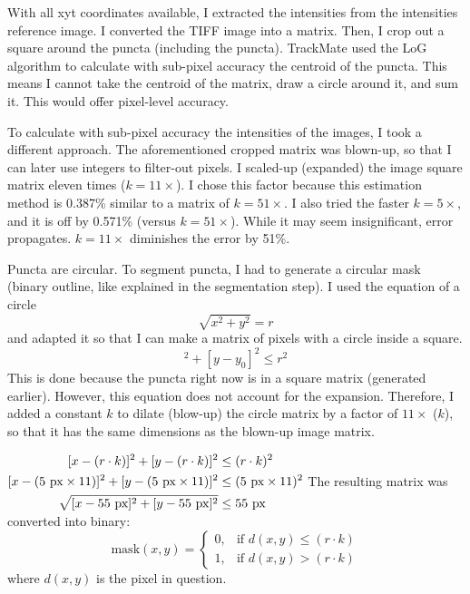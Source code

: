 With all xyt coordinates available, I extracted the intensities from the intensities reference image. I converted the TIFF image into a matrix. Then, I crop out a square around the puncta (including the puncta). TrackMate used the LoG algorithm to calculate with sub-pixel accuracy the centroid of the puncta. This means I cannot take the centroid of the matrix, draw a circle around it, and sum it. This would offer pixel-level accuracy.

To calculate with sub-pixel accuracy the intensities of the images, I took a different approach. The aforementioned cropped matrix was blown-up, so that I can later use integers to filter-out pixels. I scaled-up (expanded) the image square matrix eleven times ($k = 11 \times$). I chose this factor because this estimation method is 0.387\% similar to a matrix of $k = 51 \times$. I also tried the faster $k = 5 \times$, and it is off by 0.571\% (versus $k = 51 \times$). While it may seem insignificant, error propagates. $k = 11\times$ diminishes the error by 51\%.

Puncta are circular. To segment puncta, I had to generate a circular mask (binary outline, like explained in the segmentation step). I used the equation of a circle \begin{equation*}\sqrt{x^2 + y^2} = r\end{equation*} and adapted it so that I can make a matrix of pixels with a circle inside a square. \begin{equation*}[x - x_0]^2 + [y - y_0]^2 \le r^2\end{equation*} This is done because the puncta right now is in a square matrix (generated earlier). However, this equation does not account for the expansion. Therefore, I added a constant $k$ to dilate (blow-up) the circle matrix by a factor of $11\times$ ($k$), so that it has the same dimensions as the blown-up image matrix.

$\begin{aligned}
\relax[x - (r \cdot k)]^2 + [y - (r \cdot k)]^2 &\le (r \cdot k)^2\\
[x - (5\text{ px} \times 11)]^2 + [y - (5\text{ px} \times 11)]^2 &\le (5\text{ px} \times 11)^2 \\
\sqrt{[x - 55\text{ px}]^2 + [y - 55\text{ px}]^2} &\le 55\text{ px}
\end{aligned}$
The resulting matrix was converted into binary:
\begin{equation*}
\text{mask}(x,y) =
\left\{\begin{array}{lr}
0, & \text{if }d(x,y)\le (r\cdot k)\\
1, & \text{if }d(x,y) > (r\cdot k)
\end{array}\right.
\end{equation*}
where $d(x,y)$ is the pixel in question.

